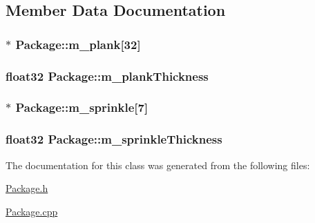 \subsection{Member Data Documentation}
\hypertarget{classPackage_a3b902b5536530fd4f66e4cbb2a59fa6f}{
\subsubsection[{m\-\_\-plank}]{$\ast$ Package\-::m\-\_\-plank\mbox{[}32\mbox{]}}}\label{classPackage_a3b902b5536530fd4f66e4cbb2a59fa6f}
\hypertarget{classPackage_a9dd0955c53dc70f64c0dda77c82022bf}{
\subsubsection[{m\-\_\-plank\-Thickness}]{\setlength{\rightskip}{0pt plus 5cm}float32 Package\-::m\-\_\-plank\-Thickness}}\label{classPackage_a9dd0955c53dc70f64c0dda77c82022bf}
\hypertarget{classPackage_a49c8135c0f0f1926e046c0fcd1904e68}{
\subsubsection[{m\-\_\-sprinkle}]{$\ast$ Package\-::m\-\_\-sprinkle\mbox{[}7\mbox{]}}}\label{classPackage_a49c8135c0f0f1926e046c0fcd1904e68}
\hypertarget{classPackage_a6c553d1b7c40cc277a141443789d1dcb}{
\subsubsection[{m\-\_\-sprinkle\-Thickness}]{\setlength{\rightskip}{0pt plus 5cm}float32 Package\-::m\-\_\-sprinkle\-Thickness}}\label{classPackage_a6c553d1b7c40cc277a141443789d1dcb}


The documentation for this class was generated from the following files\-:\begin{DoxyCompactItemize}
\item 
\hyperlink{Package_8h}{Package.\-h}\item 
\hyperlink{Package_8cpp}{Package.\-cpp}\end{DoxyCompactItemize}
